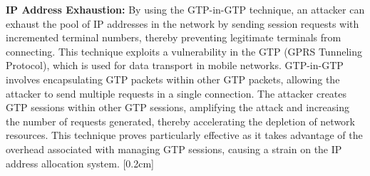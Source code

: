 \documentclass[english]{article}
\begin{document}
\textbf{IP Address Exhaustion:} By using the GTP-in-GTP technique, an attacker can exhaust
the pool of IP addresses in the network by sending session requests with incremented terminal numbers,
thereby preventing legitimate terminals from connecting. This technique exploits a vulnerability
in the GTP (GPRS Tunneling Protocol), which is used for data transport in mobile networks.
GTP-in-GTP involves encapsulating GTP packets within other GTP packets, allowing the attacker
to send multiple requests in a single connection. The attacker creates GTP sessions within other
GTP sessions, amplifying the attack and increasing the number of requests generated, thereby
accelerating the depletion of network resources. This technique proves particularly effective
as it takes advantage of the overhead associated with managing GTP sessions, causing a strain
on the IP address allocation system.\@
[0.2cm]
\end{document}
